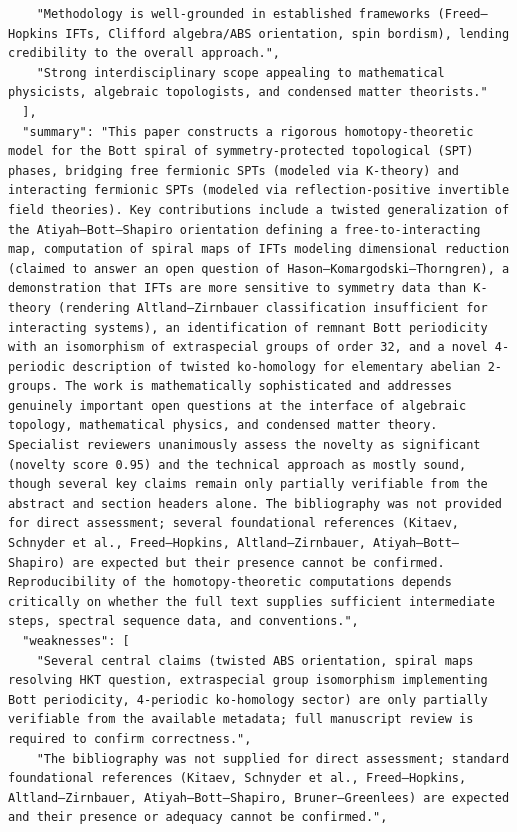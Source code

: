 \documentclass[11pt]{article}
\begin{document}
\begin{verbatim}
    "Methodology is well-grounded in established frameworks (Freed–Hopkins IFTs, Clifford algebra/ABS orientation, spin bordism), lending credibility to the overall approach.",
    "Strong interdisciplinary scope appealing to mathematical physicists, algebraic topologists, and condensed matter theorists."
  ],
  "summary": "This paper constructs a rigorous homotopy-theoretic model for the Bott spiral of symmetry-protected topological (SPT) phases, bridging free fermionic SPTs (modeled via K-theory) and interacting fermionic SPTs (modeled via reflection-positive invertible field theories). Key contributions include a twisted generalization of the Atiyah–Bott–Shapiro orientation defining a free-to-interacting map, computation of spiral maps of IFTs modeling dimensional reduction (claimed to answer an open question of Hason–Komargodski–Thorngren), a demonstration that IFTs are more sensitive to symmetry data than K-theory (rendering Altland–Zirnbauer classification insufficient for interacting systems), an identification of remnant Bott periodicity with an isomorphism of extraspecial groups of order 32, and a novel 4-periodic description of twisted ko-homology for elementary abelian 2-groups. The work is mathematically sophisticated and addresses genuinely important open questions at the interface of algebraic topology, mathematical physics, and condensed matter theory. Specialist reviewers unanimously assess the novelty as significant (novelty score 0.95) and the technical approach as mostly sound, though several key claims remain only partially verifiable from the abstract and section headers alone. The bibliography was not provided for direct assessment; several foundational references (Kitaev, Schnyder et al., Freed–Hopkins, Altland–Zirnbauer, Atiyah–Bott–Shapiro) are expected but their presence cannot be confirmed. Reproducibility of the homotopy-theoretic computations depends critically on whether the full text supplies sufficient intermediate steps, spectral sequence data, and conventions.",
  "weaknesses": [
    "Several central claims (twisted ABS orientation, spiral maps resolving HKT question, extraspecial group isomorphism implementing Bott periodicity, 4-periodic ko-homology sector) are only partially verifiable from the available metadata; full manuscript review is required to confirm correctness.",
    "The bibliography was not supplied for direct assessment; standard foundational references (Kitaev, Schnyder et al., Freed–Hopkins, Altland–Zirnbauer, Atiyah–Bott–Shapiro, Bruner–Greenlees) are expected and their presence or adequacy cannot be confirmed.",

\end{verbatim}
\end{document}
